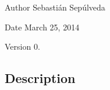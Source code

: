 \begin{DoxyAuthor}{Author}
Sebastián Sepúlveda 
\end{DoxyAuthor}
\begin{DoxyDate}{Date}
March 25, 2014 
\end{DoxyDate}
\begin{DoxyVersion}{Version}
0.
\end{DoxyVersion}
\subsection*{Description}